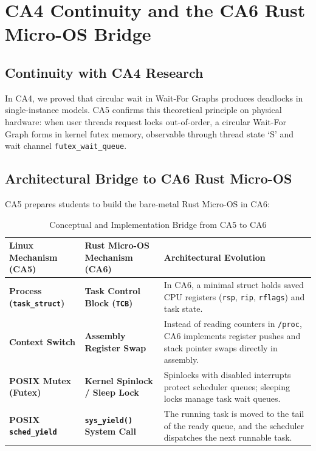 \documentclass[11pt,a4paper]{article}
\begin{document}
\section{CA4 Continuity and the CA6 Rust Micro-OS Bridge}

\subsection{Continuity with CA4 Research}
In CA4, we proved that circular wait in Wait-For Graphs produces deadlocks in single-instance models. CA5 confirms this theoretical principle on physical hardware: when user threads request locks out-of-order, a circular Wait-For Graph forms in kernel futex memory, observable through thread state `S' and wait channel \texttt{futex\_wait\_queue}.

\subsection{Architectural Bridge to CA6 Rust Micro-OS}
CA5 prepares students to build the bare-metal Rust Micro-OS in CA6:

\begin{table}[H]
\centering
\caption{Conceptual and Implementation Bridge from CA5 to CA6}
\label{tab:ca6_bridge}
\begin{tabularx}{\textwidth}{lXX}
\toprule
\textbf{Linux Mechanism (CA5)} & \textbf{Rust Micro-OS Mechanism (CA6)} & \textbf{Architectural Evolution} \\
\midrule
\textbf{Process (\texttt{task\_struct})} & \textbf{Task Control Block (\texttt{TCB})} & In CA6, a minimal struct holds saved CPU registers (\texttt{rsp}, \texttt{rip}, \texttt{rflags}) and task state. \\
\textbf{Context Switch} & \textbf{Assembly Register Swap} & Instead of reading counters in \texttt{/proc}, CA6 implements register pushes and stack pointer swaps directly in assembly. \\
\textbf{POSIX Mutex (Futex)} & \textbf{Kernel Spinlock / Sleep Lock} & Spinlocks with disabled interrupts protect scheduler queues; sleeping locks manage task wait queues. \\
\textbf{POSIX \texttt{sched\_yield}} & \textbf{\texttt{sys\_yield()} System Call} & The running task is moved to the tail of the ready queue, and the scheduler dispatches the next runnable task. \\
\bottomrule
\end{tabularx}
\end{table}
\end{document}
